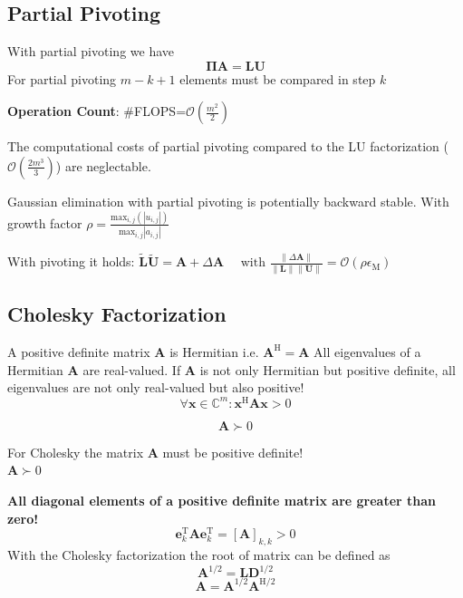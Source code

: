 \documentclass[english]{latex4ei/latex4ei_sheet}
\begin{document}
\begin{sectionbox}
\subsection{Partial Pivoting}
With partial pivoting we have
$$\mathbf{\Pi}\mathbf{A} = \mathbf{L}\mathbf{U}$$
For partial pivoting $m-k+1$ elements must be compared in step $k$
\begin{emphbox}
	\large \textbf{Operation Count}: \#FLOPS=$\mathcal{O}(\frac{m^2}{2})$\\
\end{emphbox}
The computational costs of partial pivoting compared to the LU factorization ($\mathcal{O}(\frac{2m^3}{3})$) are neglectable.
\begin{emphbox}
	\large Gaussian elimination with partial pivoting is potentially backward stable. With growth factor $\rho=\frac{\text{max}_{i,j}(|u_{i,j}|)}{\text{max}_{i,j} |a_{i,j}|}$
\end{emphbox}
With pivoting it holds:
$\tilde{\mathbf{L}}\tilde{\mathbf{U}} = \mathbf{A} + \Delta\mathbf{A}\quad \text{ with } \frac{\parallel \Delta \mathbf{A} \parallel}{\parallel\mathbf{L}\parallel\parallel\mathbf{U}\parallel} = \mathcal{O}(\rho \epsilon_\text{M})$
\end{sectionbox} 
\begin{sectionbox}
\subsection{Cholesky Factorization}
A positive definite matrix $\mathbf{A}$ is Hermitian i.e. $\mathbf{A}^\text{H} = \mathbf{A}$
All eigenvalues of a Hermitian $\mathbf{A}$ are real-valued. If $\mathbf{A}$ is not only Hermitian but positive definite, all eigenvalues are not only real-valued but also positive!
$$\forall \mathbf{x}\in\mathbb{C}^{m}: \mathbf{x}^\text{H}\mathbf{A}\mathbf{x} > 0$$

$$\mathbf{A} \succ 0$$

\begin{emphbox}
	\large For Cholesky the matrix $\mathbf{A}$ must be positive definite!\\ $\mathbf{A} \succ 0$
\end{emphbox}
\textbf{All diagonal elements of a positive definite matrix are greater than zero!}
$$\mathbf{e}^\text{T}_k \mathbf{A}\mathbf{e}^\text{T}_k = [\mathbf{A}]_{k,k} > 0$$
With the Cholesky factorization the root of matrix can be defined as
$$\mathbf{A}^{1/2} = \mathbf{L}\mathbf{D}^{1/2}$$
$$\mathbf{A} = \mathbf{A}^{1/2}\mathbf{A}^{\text{H}/2}$$

\end{sectionbox}
\end{document}
